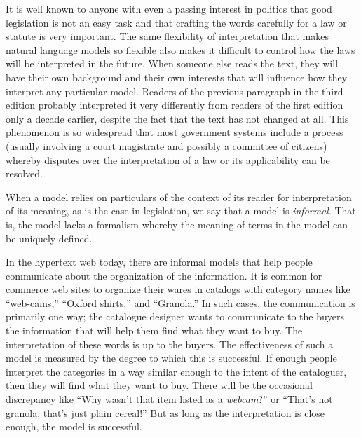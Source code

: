It is well known to anyone with even a passing interest in politics that
good legislation is not an easy task and that crafting the words
carefully for a law or statute is very important. The same flexibility
of interpretation that makes natural language models so flexible also
makes it difficult to control how the laws will be interpreted in the
future. When someone else reads the text, they will have their own
background and their own interests that will influence how they
interpret any particular model. Readers of the previous paragraph in the
third edition probably interpreted it very differently from readers of
the first edition only a decade earlier, despite the fact that the text
has not changed at all. This phenomenon is so widespread that most
government systems include a process (usually involving a court
magistrate and possibly a committee of citizens) whereby disputes over
the interpretation of a law or its applicability can be resolved.

When a model relies on particulars of the context of its reader for
interpretation of its meaning, as is the case in legislation, we say
that a model is \emph{informal}. That is, the model lacks a formalism
whereby the meaning of terms in the model can be uniquely defined.

In the hypertext web today, there are informal models that help people
communicate about the organization of the information. It is common for
commerce web sites to organize their wares in catalogs with category
names like ``web-cams,'' ``Oxford shirts,'' and ``Granola.'' In such
cases, the communication is primarily one way; the catalogue designer
wants to communicate to the buyers the information that will help them
find what they want to buy. The interpretation of these words is up to
the buyers. The effectiveness of such a model is measured by the degree
to which this is successful. If enough people interpret the categories
in a way similar enough to the intent of the cataloguer, then they will
find what they want to buy. There will be the occasional discrepancy
like ``Why wasn't that item listed as a \emph{webcam}?'' or ``That's not
granola, that's just plain cereal!'' But as long as the interpretation
is close enough, the model is successful.


